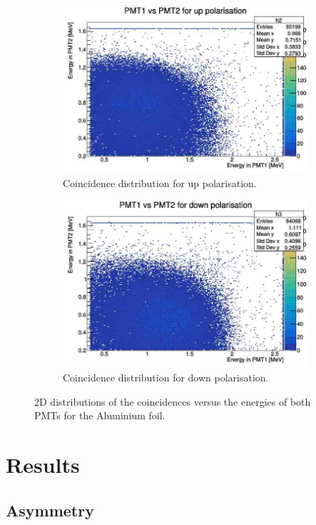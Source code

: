 \documentclass[10pt,swedish, openany]{book}
\begin{document}
\begin{figure}[H]
\begin{subfigure}{.5\textwidth}
  \centering
  \includegraphics[width=.8\linewidth]{unpolup.jpg}  
  \caption{Coincidence distribution for up polarisation.}
  \label{fig:unup}
\end{subfigure}
\begin{subfigure}{.5\textwidth}
  \centering
  \includegraphics[width=.8\linewidth]{unPoldown.jpg}  
  \caption{Coincidence distribution for down polarisation.}
  \label{fig:undown}
\end{subfigure}
\caption{2D distributions of the coincidences versus the energies of both PMTs for the Aluminium foil.}
\label{fig:unpol}
\end{figure}

\section{Results}

\subsection{Asymmetry}
\end{document}
